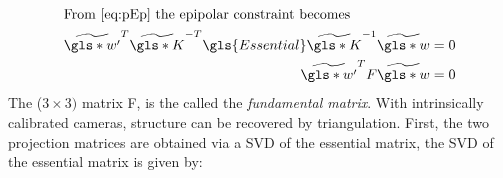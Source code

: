 \documentclass{osa-article}
\begin{document}
\begin{align}
  \intertext{From~\eqref{eq:pEp} the epipolar constraint becomes}
  \widetilde{\gls*{w'}} ^T \widetilde{\gls*{K}}^{-T} \gls{Essential} \widetilde{\gls*{K}}^{-1} \widetilde{\gls*{w}} & = 0 \\
  \widetilde{\gls*{w'}} ^T F \widetilde{\gls*{w}}                                                                   & = 0
\end{align}
The (\(3\times3)\) matrix \gls*{F}, is the called the \emph{fundamental matrix}.
With intrinsically calibrated cameras, structure can be recovered by triangulation.
First, the two projection matrices are obtained via a SVD of the essential matrix,
the SVD of the essential matrix is given by:
\end{document}
